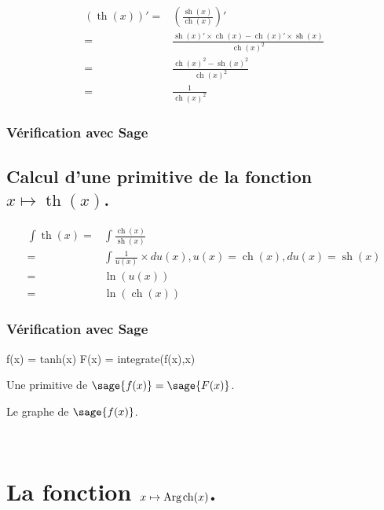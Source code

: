 \documentclass[a4paper,12pt]{report}
\renewcommand{\sinh}{\mathop{\mathrm{sh}}}
\renewcommand{\cosh}{\mathop{\mathrm{ch}}}
\renewcommand{\tanh}{\mathop{\mathrm{th}}}
\renewcommand{\arg}{\mathop{\mathrm{Arg}}}
\begin{document}
\begin{align*}
(\tanh(x))' = & \left(\frac{\sinh(x)}{\cosh(x)}\right)' \\  = & \frac{\sinh(x)' \times \cosh(x) - \cosh(x)' \times \sinh(x)}{\cosh(x)^2} \\ = &  \frac{\cosh(x)^2 -\sinh(x)^2}{\cosh(x)^2} \\ = & \frac{1}{\cosh(x)^2}
\end{align*}


\subsubsection{Vérification avec Sage}


\subsection{Calcul d'une primitive de la fonction  $x \mapsto \tanh(x)$.}

\begin{align*}
\int \tanh(x) = &\int \frac{\cosh(x)}{\sinh(x)} \\  = & \int \frac{1}{u(x)} \times du(x), u(x) =  \cosh(x), du(x) = \sinh(x) \\ = & \ln(u(x)) \\ = & \ln(\cosh(x))
\end{align*}


\subsubsection{Vérification avec Sage}


\begin{sageblock}
    f(x) = tanh(x)
    F(x) = integrate(f(x),x)
\end{sageblock}

Une primitive de $\sage{f(x)} = \sage{F(x)} $.

Le graphe de $\sage{f(x)} $.


\begin{center}
 \\
\end{center}







\section{La fonction  $x \mapsto \arg\mspace{-1mu}\cosh(x)$.}
\end{document}
